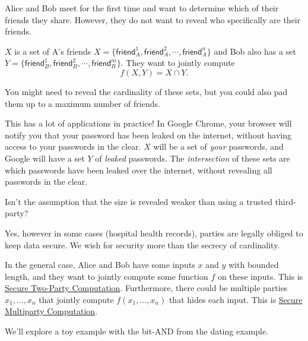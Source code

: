 \begin{example*}
    Alice and Bob meet for the first time and want to determine which of their friends they share. However, they do not want to reveal who specifically are their friends.

    $X$ is a set of A's friends $X = \{\mathsf{friend}_A^1, \mathsf{friend}_A^2, \cdots, \mathsf{friend}_A^n\}$ and Bob also has a set $Y = \{\mathsf{friend}_B^1, \mathsf{friend}_B^2, \cdots, \mathsf{friend}_B^m\}$. They want to jointly compute \[f(X, Y) = X\cap Y.\]

    You might need to reveal the cardinality of these sets, but you could also pad them up to a maximum number of friends.

    This has a lot of applications in practice! In Google Chrome, your browser will notify you that your password has been leaked on the internet, without having access to your passwords in the clear. $X$ will be a set of \emph{your} passwords, and Google will have a set $Y$ of \emph{leaked} passwords. The \emph{intersection} of these sets are which passwords have been leaked over the internet, without revealing all passwords in the clear.
\end{example*}
\begin{ques*}
    Isn't the assumption that the size is revealed weaker than using a trusted third-party?

    Yes, however in some cases (hospital health records), parties are legally obliged to keep data secure. We wish for security more than the secrecy of cardinality.
\end{ques*}

In the general case, Alice and Bob have some inputs $x$ and $y$ with bounded length, and they want to jointly compute some function $f$ on these inputs. This is \ul{Secure Two-Party Computation}. Furthermore, there could be multiple parties $x_1, \dots, x_n$ that jointly compute $f(x_1, \dots, x_n)$ that hides each input. This is \ul{Secure Multiparty Computation}.

We'll explore a toy example with the bit-\textsf{AND} from the dating example.

